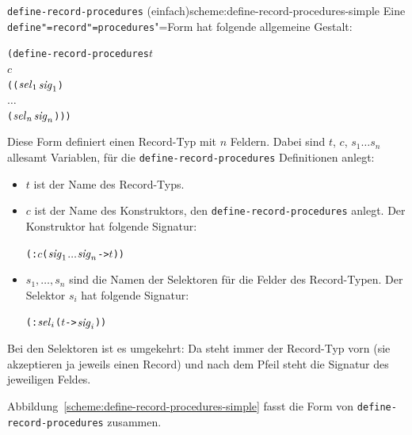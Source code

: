 \begin{feature}{\texttt{define-record-procedures} (einfach)}{scheme:define-record-procedures-simple}
Eine \texttt{define"=record"=procedures}"=Form
hat folgende allgemeine Gestalt:\label{def:define-record-procedures}
%
\begin{alltt}
(define-record-procedures \(t\)
  \(c\)
  ((\(\mathit{sel}\sb{1}\) \(\mathit{sig}\sb{1}\))
   \(\ldots\)
   (\(\mathit{sel}\sb{n}\) \(\mathit{sig}\sb{n}\))))
\end{alltt}
%
Diese Form definiert einen Record-Typ mit $n$ Feldern.
Dabei sind $t$, $c$, $s_1 \ldots s_n$ allesamt Variablen, für die
\texttt{define-record-procedures} Definitionen anlegt:
%
\begin{itemize}
\item $t$ ist der Name des Record-Typs.
\item $c$ ist der Name des Konstruktors, den
  \texttt{define-record-procedures} anlegt.  Der Konstruktor hat 
  folgende Signatur:
%  
\begin{alltt}
(: \(c\) (\(\mathit{sig}\sb{1}\) \(\ldots\) \(\mathit{sig}\sb{n}\) -> \(t\)))
\end{alltt}
\item $s_1, \ldots, s_n$ sind die Namen der Selektoren für die Felder
  des Record-Typen.  Der Selektor $s_i$ hat folgende Signatur:
% 
\begin{alltt}
(: \(\mathit{sel}\sb{i}\) (\(t\) -> \(\mathit{sig}\sb{i}\)))
\end{alltt}
\end{itemize}
%
\end{feature}

Bei den Selektoren ist es umgekehrt: Da steht immer der Record-Typ
vorn (sie akzeptieren ja jeweils einen Record) und nach dem Pfeil
steht die Signatur des jeweiligen Feldes.

Abbildung~\ref{scheme:define-record-procedures-simple} fasst die Form
von \texttt{define-record-procedures} zusammen.

